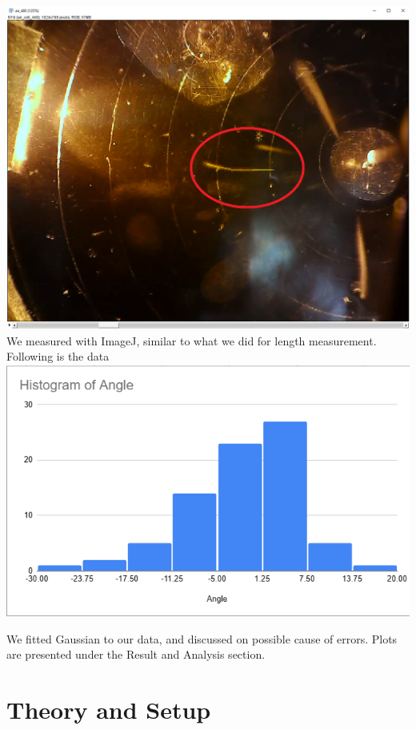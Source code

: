 \documentclass[a4paper]{tufte-handout}
\begin{document}
\includegraphics[width = 1 \textwidth]{figures/day3_bends.png}
\\
We measured with ImageJ, similar to what we did for length measurement. Following is the data
\\
\includegraphics[width = 1 \textwidth]{figures/day3_scat.png}
\\
\hrulefill

We fitted Gaussian to our data, and discussed on possible cause of errors. Plots are presented under the Result and Analysis section. 

\newpage
\section{Theory and Setup}
\end{document}
